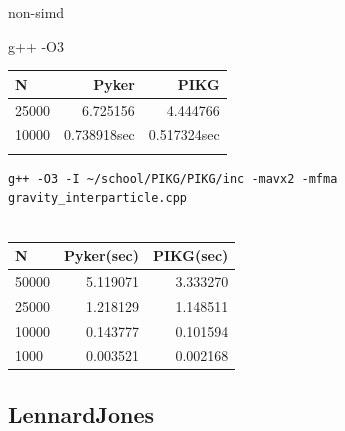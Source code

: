 \documentclass[ams, a4j]{U-AizuGT}
\begin{document}
non-simd

g++ -O3 

\begin{tabular}{|l|r|r|} \hline
  N & Pyker & PIKG \\ \hline
  25000 & 6.725156 & 4.444766 \\
  10000 & 0.738918sec & 0.517324sec \\


 \\ \hline
\end{tabular}


\begin{lstlisting}[frame=single, caption=Nbody-kernel.pikg, label=Nbody-kernel.pikg]
  g++ -O3 -I ~/school/PIKG/PIKG/inc -mavx2 -mfma gravity_interparticle.cpp
  
  \end{lstlisting}



  \begin{tabular}{|l|r|r|} \hline
    N & Pyker(sec) & PIKG(sec) \\ \hline
    50000 & 5.119071 & 3.333270\\
    25000 & 1.218129 & 1.148511 \\
    10000 & 0.143777 & 0.101594 \\
    1000 &  0.003521 & 0.002168 \\ \hline
  \end{tabular}
  

\subsection{LennardJones}
\end{document}

